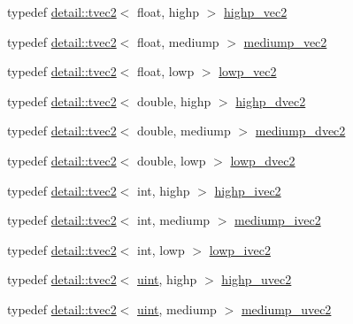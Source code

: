 \begin{DoxyCompactItemize}
\item 
typedef \hyperlink{structglm_1_1detail_1_1tvec2}{detail\+::tvec2}$<$ float, highp $>$ \hyperlink{group__core__precision_ga37645abcfcc1278567e99f1ca492bfbb}{highp\+\_\+vec2}
\item 
typedef \hyperlink{structglm_1_1detail_1_1tvec2}{detail\+::tvec2}$<$ float, mediump $>$ \hyperlink{group__core__precision_ga1365858c541931eb8a7473fa85a1d1cf}{mediump\+\_\+vec2}
\item 
typedef \hyperlink{structglm_1_1detail_1_1tvec2}{detail\+::tvec2}$<$ float, lowp $>$ \hyperlink{group__core__precision_gac63d79532b7e8d18f579ebe63e4fde49}{lowp\+\_\+vec2}
\item 
typedef \hyperlink{structglm_1_1detail_1_1tvec2}{detail\+::tvec2}$<$ double, highp $>$ \hyperlink{group__core__precision_gacfbe8512142fff27f0bfb44958c1752f}{highp\+\_\+dvec2}
\item 
typedef \hyperlink{structglm_1_1detail_1_1tvec2}{detail\+::tvec2}$<$ double, mediump $>$ \hyperlink{group__core__precision_gace1f1cc2eb8e978dcb60e682af87b541}{mediump\+\_\+dvec2}
\item 
typedef \hyperlink{structglm_1_1detail_1_1tvec2}{detail\+::tvec2}$<$ double, lowp $>$ \hyperlink{group__core__precision_ga27a115a27d5f065e8c043f57191d583b}{lowp\+\_\+dvec2}
\item 
typedef \hyperlink{structglm_1_1detail_1_1tvec2}{detail\+::tvec2}$<$ int, highp $>$ \hyperlink{group__core__precision_gab2bac6095f51f7d7f74747afc2f6747a}{highp\+\_\+ivec2}
\item 
typedef \hyperlink{structglm_1_1detail_1_1tvec2}{detail\+::tvec2}$<$ int, mediump $>$ \hyperlink{group__core__precision_ga4f1bf9844e667805235823afe809aa73}{mediump\+\_\+ivec2}
\item 
typedef \hyperlink{structglm_1_1detail_1_1tvec2}{detail\+::tvec2}$<$ int, lowp $>$ \hyperlink{group__core__precision_ga562c5c67d6431ab88fc4a032239e2137}{lowp\+\_\+ivec2}
\item 
typedef \hyperlink{structglm_1_1detail_1_1tvec2}{detail\+::tvec2}$<$ \hyperlink{group__core__precision_ga4fd29415871152bfb5abd588334147c8}{uint}, highp $>$ \hyperlink{group__core__precision_gaaf92be4c1fca33cff90c1ed15b521c79}{highp\+\_\+uvec2}
\item 
typedef \hyperlink{structglm_1_1detail_1_1tvec2}{detail\+::tvec2}$<$ \hyperlink{group__core__precision_ga4fd29415871152bfb5abd588334147c8}{uint}, mediump $>$ \hyperlink{group__core__precision_ga15c8fb77bdb6763ef73b39e02eb98a56}{mediump\+\_\+uvec2}
\item 

\end{DoxyCompactItemize}
